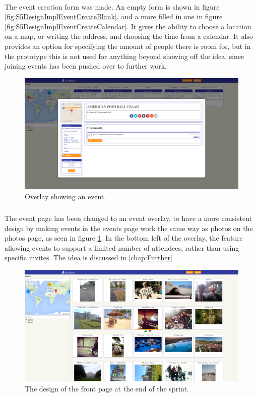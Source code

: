 \paragraph{} The event creation form was made. An empty form is shown in figure \ref{fig:S5DesignImplEventCreateBlank}, and a more filled in one in figure \ref{fig:S5DesignImplEventCreateCalendar}. It gives the ability to choose a location on a map, or writing the address, and choosing the time from a calendar. It also provides an option for specifying the amount of people there is room for, but in the prototype this is not used for anything beyond showing off the idea, since joining events has been pushed over to further work.

\begin{figure}[ht!]
  \centering
  \includegraphics[width=\linewidth]{./img/webpage/3Nov/EventsOverlay}
  \caption{Overlay showing an event.}
  \label{fig:S5DesignImplEventsOverlay}
\end{figure}

\subparagraph{} The event page has been changed to an event overlay, to have a more consistent design by making events in the events page work the same way as photos on the photos page, as seen in figure \ref{fig:S5DesignImplEventsOverlay}. In the bottom left of the overlay, the feature allowing events to support a limited number of attendees, rather than using specific invites. The idea is discussed in \ref{chap:Further}

\begin{figure}[ht!]
  \centering
  \includegraphics[width=\linewidth]{./img/webpage/3Nov/FrontpagePhotos}
  \caption{The design of the front page at the end of the sprint.}
  \label{fig:S5DesignImplFrontPhotos3Nov}
\end{figure}

